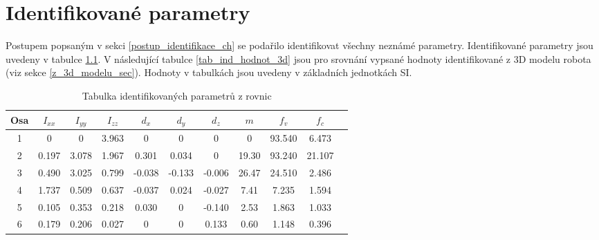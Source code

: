 

\chapter{Identifikované parametry}

Postupem popsaným v sekci \ref{postup_identifikace_ch} se podařilo identifikovat všechny neznámé parametry. Identifikované parametry jsou uvedeny v tabulce \ref{tab_ind_hodnot}. V následující tabulce \ref{tab_ind_hodnot_3d} jsou pro srovnání vypsané hodnoty identifikované z 3D modelu robota (viz sekce \ref{z_3d_modelu_sec}). Hodnoty v tabulkách jsou uvedeny v základních jednotkách SI. 
\\
\begin{table}[htbp]
  \centering
  \caption{Tabulka identifikovaných parametrů z rovnic}
    \begin{tabular}{c|cccccccccc}
    \multicolumn{1}{c|}{Osa} & \multicolumn{1}{c}{$I_{xx}$} & \multicolumn{1}{c}{$I_{yy}$} & \multicolumn{1}{c}{$I_{zz}$} & \multicolumn{1}{c}{$d_x$} & \multicolumn{1}{c}{$d_y$} & \multicolumn{1}{c}{$d_z$} & \multicolumn{1}{c}{$m$} & \multicolumn{1}{c}{$f_v$} & \multicolumn{1}{c}{$f_c$} \\
    \hline
    1  & 0     & 0     & 3.963 & 0     & 0     & 0     & 0     & 93.540 &  6.473 \\
    2  & 0.197 & 3.078 & 1.967 & 0.301 & 0.034 & 0     & 19.30 & 93.240 & 21.107 \\
    3  & 0.490 & 3.025 & 0.799 &-0.038 &-0.133 &-0.006 & 26.47 & 24.510 &  2.486 \\
    4  & 1.737 & 0.509 & 0.637 &-0.037 & 0.024 &-0.027 & 7.41  &  7.235 &  1.594 \\
    5  & 0.105 & 0.353 & 0.218 & 0.030 & 0     &-0.140 & 2.53  &  1.863 &  1.033 \\
    6  & 0.179 & 0.206 & 0.027 & 0     & 0     & 0.133 & 0.60  &  1.148 &  0.396 \\
    \end{tabular}%
  \label{tab_ind_hodnot}%
\end{table}%

